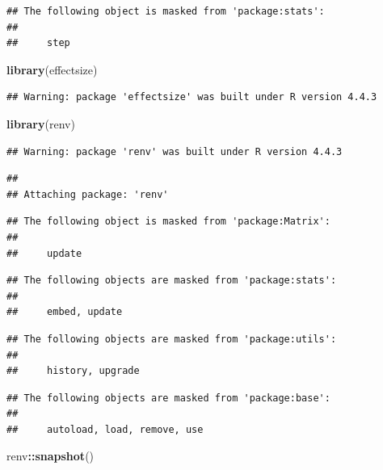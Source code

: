 \documentclass[
]{article}
\newenvironment{Shaded}{\begin{snugshade}}{\end{snugshade}}
\newcommand{\FunctionTok}[1]{\textcolor[rgb]{0.13,0.29,0.53}{\textbf{#1}}}
\newcommand{\NormalTok}[1]{#1}
\newcommand{\SpecialCharTok}[1]{\textcolor[rgb]{0.81,0.36,0.00}{\textbf{#1}}}
\begin{document}
\begin{verbatim}
## The following object is masked from 'package:stats':
## 
##     step
\end{verbatim}

\begin{Shaded}
\begin{Highlighting}[]
\FunctionTok{library}\NormalTok{(effectsize)}
\end{Highlighting}
\end{Shaded}

\begin{verbatim}
## Warning: package 'effectsize' was built under R version 4.4.3
\end{verbatim}

\begin{Shaded}
\begin{Highlighting}[]
\FunctionTok{library}\NormalTok{(renv)}
\end{Highlighting}
\end{Shaded}

\begin{verbatim}
## Warning: package 'renv' was built under R version 4.4.3
\end{verbatim}

\begin{verbatim}
## 
## Attaching package: 'renv'
\end{verbatim}

\begin{verbatim}
## The following object is masked from 'package:Matrix':
## 
##     update
\end{verbatim}

\begin{verbatim}
## The following objects are masked from 'package:stats':
## 
##     embed, update
\end{verbatim}

\begin{verbatim}
## The following objects are masked from 'package:utils':
## 
##     history, upgrade
\end{verbatim}

\begin{verbatim}
## The following objects are masked from 'package:base':
## 
##     autoload, load, remove, use
\end{verbatim}

\begin{Shaded}
\begin{Highlighting}[]
\NormalTok{renv}\SpecialCharTok{::}\FunctionTok{snapshot}\NormalTok{()}
\end{Highlighting}
\end{Shaded}
\end{document}
